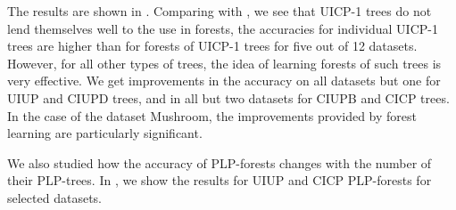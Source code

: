The results are shown in . Comparing with ,
we see that UICP-1 trees do not lend themselves well to the use in forests,
the accuracies for individual UICP-1 trees are higher than for forests of
UICP-1 trees for five out of 12 datasets. However, for all other types of
trees, the idea of learning forests of such trees is very effective. We get
improvements in the accuracy on all datasets but one for UIUP and CIUPD
trees, and in all but two datasets for CIUPB and CICP trees. In the case 
of the dataset Mushroom, the improvements provided by forest learning are 
particularly significant.

We also studied how the accuracy of PLP-forests changes with the number of
their PLP-trees. In , we show the results for UIUP and CICP 
PLP-forests for selected datasets.

%
%

